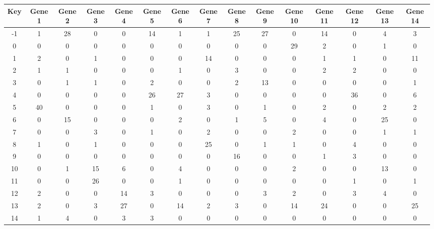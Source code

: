 \begin{tabular}{|c|c|c|c|c|c|c|c|c|c|c|c|c|c|c|}
\hline
Key & Gene 1 & Gene 2 & Gene 3 & Gene 4 & Gene 5 & Gene 6 & Gene 7 & Gene 8 & Gene 9 & Gene 10 & Gene 11 & Gene 12 & Gene 13 & Gene 14 \\
\hline
-1 & 1 & 28 & 0 & 0 & 14 & 1 & 1 & 25 & 27 & 0 & 14 & 0 & 4 & 3 \\
0 & 0 & 0 & 0 & 0 & 0 & 0 & 0 & 0 & 0 & 29 & 2 & 0 & 1 & 0 \\
1 & 2 & 0 & 1 & 0 & 0 & 0 & 14 & 0 & 0 & 0 & 1 & 1 & 0 & 11 \\
2 & 1 & 1 & 0 & 0 & 0 & 1 & 0 & 3 & 0 & 0 & 2 & 2 & 0 & 0 \\
3 & 0 & 1 & 1 & 0 & 2 & 0 & 0 & 2 & 13 & 0 & 0 & 0 & 0 & 1 \\
4 & 0 & 0 & 0 & 0 & 26 & 27 & 3 & 0 & 0 & 0 & 0 & 36 & 0 & 6 \\
5 & 40 & 0 & 0 & 0 & 1 & 0 & 3 & 0 & 1 & 0 & 2 & 0 & 2 & 2 \\
6 & 0 & 15 & 0 & 0 & 0 & 2 & 0 & 1 & 5 & 0 & 4 & 0 & 25 & 0 \\
7 & 0 & 0 & 3 & 0 & 1 & 0 & 2 & 0 & 0 & 2 & 0 & 0 & 1 & 1 \\
8 & 1 & 0 & 1 & 0 & 0 & 0 & 25 & 0 & 1 & 1 & 0 & 4 & 0 & 0 \\
9 & 0 & 0 & 0 & 0 & 0 & 0 & 0 & 16 & 0 & 0 & 1 & 3 & 0 & 0 \\
10 & 0 & 1 & 15 & 6 & 0 & 4 & 0 & 0 & 0 & 2 & 0 & 0 & 13 & 0 \\
11 & 0 & 0 & 26 & 0 & 0 & 1 & 0 & 0 & 0 & 0 & 0 & 1 & 0 & 1 \\
12 & 2 & 0 & 0 & 14 & 3 & 0 & 0 & 0 & 3 & 2 & 0 & 3 & 4 & 0 \\
13 & 2 & 0 & 3 & 27 & 0 & 14 & 2 & 3 & 0 & 14 & 24 & 0 & 0 & 25 \\
14 & 1 & 4 & 0 & 3 & 3 & 0 & 0 & 0 & 0 & 0 & 0 & 0 & 0 & 0 \\
\hline
\end{tabular}